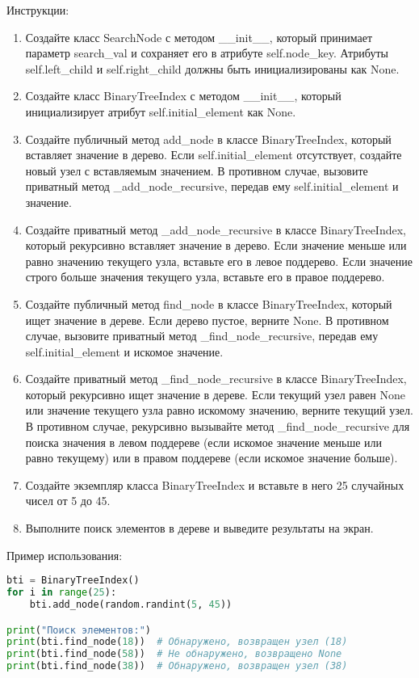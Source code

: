 \begin{enumerate}
Инструкции:
\begin{enumerate}
    \item Создайте класс SearchNode с методом \_\_init\_\_, который принимает параметр search\_val и сохраняет его в атрибуте self.node\_key. Атрибуты self.left\_child и self.right\_child должны быть инициализированы как None.
    \item Создайте класс BinaryTreeIndex с методом \_\_init\_\_, который инициализирует атрибут self.initial\_element как None.
    \item Создайте публичный метод add\_node в классе BinaryTreeIndex, который вставляет значение в дерево. Если self.initial\_element отсутствует, создайте новый узел с вставляемым значением. В противном случае, вызовите приватный метод \_add\_node\_recursive, передав ему self.initial\_element и значение.
    \item Создайте приватный метод \_add\_node\_recursive в классе BinaryTreeIndex, который рекурсивно вставляет значение в дерево. Если значение меньше или равно значению текущего узла, вставьте его в левое поддерево. Если значение строго больше значения текущего узла, вставьте его в правое поддерево.
    \item Создайте публичный метод find\_node в классе BinaryTreeIndex, который ищет значение в дереве. Если дерево пустое, верните None. В противном случае, вызовите приватный метод \_find\_node\_recursive, передав ему self.initial\_element и искомое значение.
    \item Создайте приватный метод \_find\_node\_recursive в классе BinaryTreeIndex, который рекурсивно ищет значение в дереве. Если текущий узел равен None или значение текущего узла равно искомому значению, верните текущий узел. В противном случае, рекурсивно вызывайте метод \_find\_node\_recursive для поиска значения в левом поддереве (если искомое значение меньше или равно текущему) или в правом поддереве (если искомое значение больше).
    \item Создайте экземпляр класса BinaryTreeIndex и вставьте в него 25 случайных чисел от 5 до 45.
    \item Выполните поиск элементов в дереве и выведите результаты на экран.
\end{enumerate}

Пример использования:
\begin{lstlisting}[language=Python]
bti = BinaryTreeIndex()
for i in range(25):
    bti.add_node(random.randint(5, 45))

print("Поиск элементов:")
print(bti.find_node(18))  # Обнаружено, возвращен узел (18)
print(bti.find_node(58))  # Не обнаружено, возвращено None
print(bti.find_node(38))  # Обнаружено, возвращен узел (38)
\end{lstlisting}


\end{enumerate}
